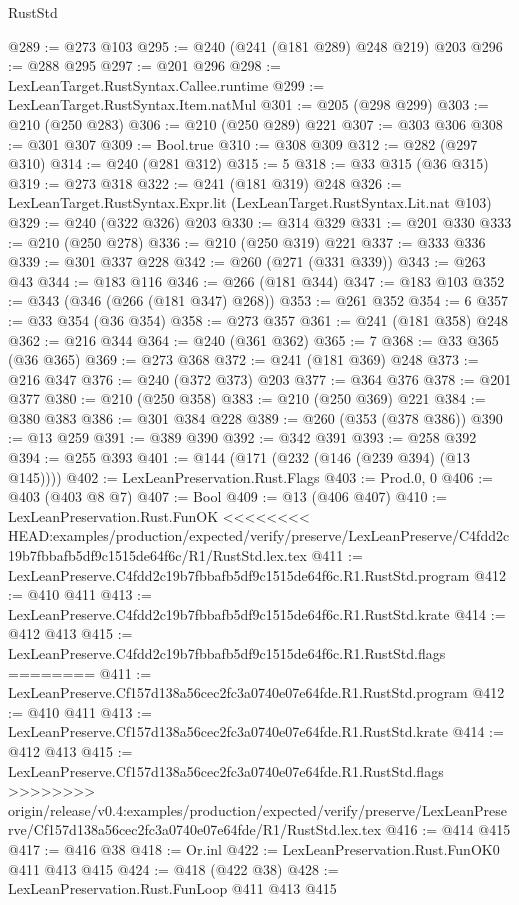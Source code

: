 \begin{lexlean}{RustStd}
\begin{coremodule}
{\begin{coremodule}
{{{{{{@289 := @273 @103
@295 := @240 (@241 (@181 @289) @248 @219) @203
@296 := @288 @295
@297 := @201 @296
@298 := LexLeanTarget.RustSyntax.Callee.runtime
@299 := LexLeanTarget.RustSyntax.Item.natMul
@301 := @205 (@298 @299)
@303 := @210 (@250 @283)
@306 := @210 (@250 @289) @221
@307 := @303 @306
@308 := @301 @307
@309 := Bool.true
@310 := @308 @309
@312 := @282 (@297 @310)
@314 := @240 (@281 @312)
@315 := 5
@318 := @33 @315 (@36 @315)
@319 := @273 @318
@322 := @241 (@181 @319) @248
@326 := LexLeanTarget.RustSyntax.Expr.lit (LexLeanTarget.RustSyntax.Lit.nat @103)
@329 := @240 (@322 @326) @203
@330 := @314 @329
@331 := @201 @330
@333 := @210 (@250 @278)
@336 := @210 (@250 @319) @221
@337 := @333 @336
@339 := @301 @337 @228
@342 := @260 (@271 (@331 @339))
@343 := @263 @43
@344 := @183 @116
@346 := @266 (@181 @344)
@347 := @183 @103
@352 := @343 (@346 (@266 (@181 @347) @268))
@353 := @261 @352
@354 := 6
@357 := @33 @354 (@36 @354)
@358 := @273 @357
@361 := @241 (@181 @358) @248
@362 := @216 @344
@364 := @240 (@361 @362)
@365 := 7
@368 := @33 @365 (@36 @365)
@369 := @273 @368
@372 := @241 (@181 @369) @248
@373 := @216 @347
@376 := @240 (@372 @373) @203
@377 := @364 @376
@378 := @201 @377
@380 := @210 (@250 @358)
@383 := @210 (@250 @369) @221
@384 := @380 @383
@386 := @301 @384 @228
@389 := @260 (@353 (@378 @386))
@390 := @13 @259
@391 := @389 @390
@392 := @342 @391
@393 := @258 @392
@394 := @255 @393
@401 := @144 (@171 (@232 (@146 (@239 @394) (@13 @145))))
@402 := LexLeanPreservation.Rust.Flags
@403 := Prod.{0, 0}
@406 := @403 (@403 @8 @7)
@407 := Bool
@409 := @13 (@406 @407)
@410 := LexLeanPreservation.Rust.FunOK
<<<<<<<< HEAD:examples/production/expected/verify/preserve/LexLeanPreserve/C4fdd2c19b7fbbafb5df9c1515de64f6c/R1/RustStd.lex.tex
@411 := LexLeanPreserve.C4fdd2c19b7fbbafb5df9c1515de64f6c.R1.RustStd.program
@412 := @410 @411
@413 := LexLeanPreserve.C4fdd2c19b7fbbafb5df9c1515de64f6c.R1.RustStd.krate
@414 := @412 @413
@415 := LexLeanPreserve.C4fdd2c19b7fbbafb5df9c1515de64f6c.R1.RustStd.flags
========
@411 := LexLeanPreserve.Cf157d138a56cec2fc3a0740e07e64fde.R1.RustStd.program
@412 := @410 @411
@413 := LexLeanPreserve.Cf157d138a56cec2fc3a0740e07e64fde.R1.RustStd.krate
@414 := @412 @413
@415 := LexLeanPreserve.Cf157d138a56cec2fc3a0740e07e64fde.R1.RustStd.flags
>>>>>>>> origin/release/v0.4:examples/production/expected/verify/preserve/LexLeanPreserve/Cf157d138a56cec2fc3a0740e07e64fde/R1/RustStd.lex.tex
@416 := @414 @415
@417 := @416 @38
@418 := Or.inl
@422 := LexLeanPreservation.Rust.FunOK0 @411 @413 @415
@424 := @418 (@422 @38)
@428 := LexLeanPreservation.Rust.FunLoop @411 @413 @415
}}}}}}
\end{coremodule}}
\end{coremodule}
\end{lexlean}
